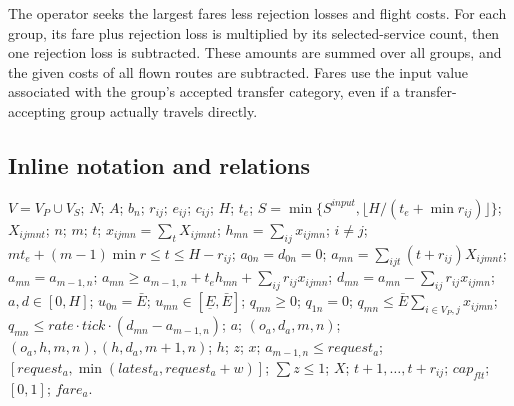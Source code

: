 \documentclass[10pt]{article}
\begin{document}
The operator seeks the largest fares less rejection losses and flight costs. For each group, its fare plus rejection loss is multiplied by its selected-service count, then one rejection loss is subtracted. These amounts are summed over all groups, and the given costs of all flown routes are subtracted. Fares use the input value associated with the group's accepted transfer category, even if a transfer-accepting group actually travels directly.

\subsection*{Inline notation and relations}
$V=V_P\cup V_S$; $N$; $A$; $b_n$; $r_{ij}$; $e_{ij}$; $c_{ij}$; $H$; $t_e$; $S=\min\{S^{input},\lfloor H/(t_e+\min r_{ij})\rfloor\}$; $X_{ijmnt}$; $n$; $m$; $t$; $x_{ijmn}=\sum_tX_{ijmnt}$; $h_{mn}=\sum_{ij}x_{ijmn}$; $i\ne j$; $mt_e+(m-1)\min r\le t\le H-r_{ij}$; $a_{0n}=d_{0n}=0$; $a_{mn}=\sum_{ijt}(t+r_{ij})X_{ijmnt}$; $a_{mn}=a_{m-1,n}$; $a_{mn}\ge a_{m-1,n}+t_eh_{mn}+\sum_{ij}r_{ij}x_{ijmn}$; $d_{mn}=a_{mn}-\sum_{ij}r_{ij}x_{ijmn}$; $a,d\in[0,H]$; $u_{0n}=\bar E$; $u_{mn}\in[\underline E,\bar E]$; $q_{mn}\ge0$; $q_{1n}=0$; $q_{mn}\le\bar E\sum_{i\in V_P,j}x_{ijmn}$; $q_{mn}\le rate\cdot tick\cdot(d_{mn}-a_{m-1,n})$; $a$; $(o_a,d_a,m,n)$; $(o_a,h,m,n),(h,d_a,m+1,n)$; $h$; $z$; $x$; $a_{m-1,n}\le request_a$; $[request_a,\min(latest_a,request_a+w)]$; $\sum z\le1$; $X$; $t+1,\ldots,t+r_{ij}$; $cap_{flt}$; $[0,1]$; $fare_a$.
\end{document}
